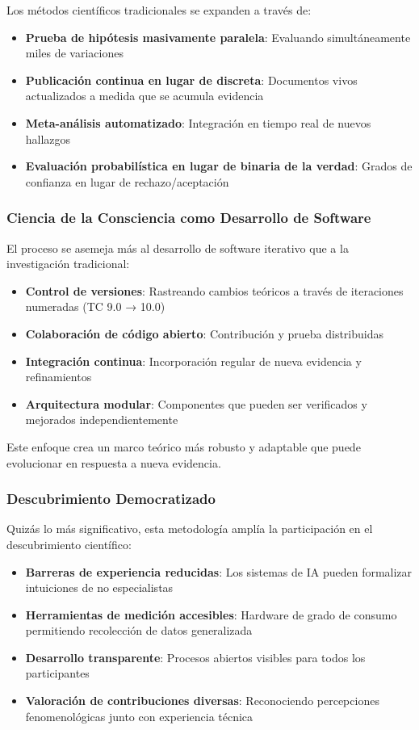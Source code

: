 \documentclass[12pt]{article}
\begin{document}
Los métodos científicos tradicionales se expanden a través de:

\begin{itemize}
    \item \textbf{Prueba de hipótesis masivamente paralela}: Evaluando simultáneamente miles de variaciones
    \item \textbf{Publicación continua en lugar de discreta}: Documentos vivos actualizados a medida que se acumula evidencia
    \item \textbf{Meta-análisis automatizado}: Integración en tiempo real de nuevos hallazgos
    \item \textbf{Evaluación probabilística en lugar de binaria de la verdad}: Grados de confianza en lugar de rechazo/aceptación
\end{itemize}

\subsubsection{Ciencia de la Consciencia como Desarrollo de Software}

El proceso se asemeja más al desarrollo de software iterativo que a la investigación tradicional:

\begin{itemize}
    \item \textbf{Control de versiones}: Rastreando cambios teóricos a través de iteraciones numeradas (TC 9.0 → 10.0)
    \item \textbf{Colaboración de código abierto}: Contribución y prueba distribuidas
    \item \textbf{Integración continua}: Incorporación regular de nueva evidencia y refinamientos
    \item \textbf{Arquitectura modular}: Componentes que pueden ser verificados y mejorados independientemente
\end{itemize}

Este enfoque crea un marco teórico más robusto y adaptable que puede evolucionar en respuesta a nueva evidencia.

\subsubsection{Descubrimiento Democratizado}

Quizás lo más significativo, esta metodología amplía la participación en el descubrimiento científico:

\begin{itemize}
    \item \textbf{Barreras de experiencia reducidas}: Los sistemas de IA pueden formalizar intuiciones de no especialistas
    \item \textbf{Herramientas de medición accesibles}: Hardware de grado de consumo permitiendo recolección de datos generalizada
    \item \textbf{Desarrollo transparente}: Procesos abiertos visibles para todos los participantes
    \item \textbf{Valoración de contribuciones diversas}: Reconociendo percepciones fenomenológicas junto con experiencia técnica
\end{itemize}
\end{document}
